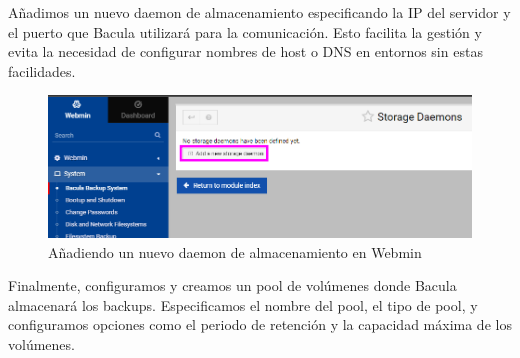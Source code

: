 Añadimos un nuevo daemon de almacenamiento especificando la IP del servidor y el puerto que Bacula utilizará para la comunicación. Esto facilita la gestión y evita la necesidad de configurar nombres de host o DNS en entornos sin estas facilidades.

\begin{figure}[H]
    \centering
    \includegraphics[width=0.5\linewidth]{instalacionBacula/newsd.png}
    \caption{Añadiendo un nuevo daemon de almacenamiento en Webmin}
\end{figure}

Finalmente, configuramos y creamos un pool de volúmenes donde Bacula almacenará los backups. Especificamos el nombre del pool, el tipo de pool, y configuramos opciones como el periodo de retención y la capacidad máxima de los volúmenes.



